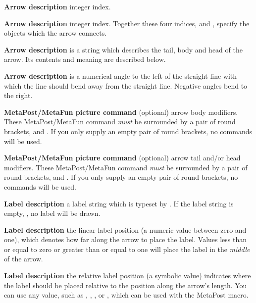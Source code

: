 \item {\bf Arrow description }  integer index.

\item {\bf Arrow description }  integer index. Together these
four indices,  and , specify
the objects which the arrow connects.

\item {\bf Arrow description }  is a string which
describes the tail, body and head of the arrow. Its contents and meaning
are described below.

\item {\bf Arrow description }  is a numerical angle to the
left of the straight line with which the line should bend away from the
straight line. Negative angles bend to the right.

\item {\bf MetaPost/MetaFun picture command} (optional) arrow body
modifiers. These MetaPost/MetaFun command \emph{must} be surrounded by a
pair of round brackets,  and . If you only supply an
empty pair of round brackets, no commands will be used.

\item {\bf MetaPost/MetaFun picture command} (optional) arrow tail and/or
head modifiers. These MetaPost/MetaFun command \emph{must} be surrounded
by a pair of round brackets,  and . If you only supply
an empty pair of round brackets, no commands will be used.

\item {\bf Label description} a label string which is typeset by \ConTeXt.
If the label string is empty, , no label will be drawn.

\item {\bf Label description} the linear label position (a numeric value
between zero and one), which denotes how far along the arrow to place the
label. Values less than or equal to zero or greater than or equal to one
will place the label in the \emph{middle} of the arrow.

\item {\bf Label description} the relative label position (a symbolic
value) indicates where the label should be placed relative to the position
along the arrow's length. You can use any value, such as ,
, , or , which can be used with the MetaPost
 macro.

